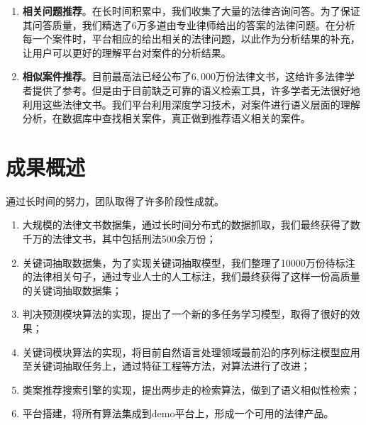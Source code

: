 \begin{enumerate}[1)]
	\item \textbf{相关问题推荐}。在长时间积累中，我们收集了大量的法律咨询问答。为了保证其问答质量，我们精选了$6$万多道由专业律师给出的答案的法律问题。在分析每一个案件时，平台相应的给出相关的法律问题，以此作为分析结果的补充，让用户可以更好的理解平台对案件的分析结果。
	\item \textbf{相似案件推荐}。目前最高法已经公布了$6,000$万份法律文书，这给许多法律学者提供了参考。但是由于目前缺乏可靠的语义检索工具，许多学者无法很好地利用这些法律文书。我们平台利用深度学习技术，对案件进行语义层面的理解分析，在数据库中查找相关案件，真正做到推荐语义相关的案件。
	\end{enumerate}


\section{成果概述}

通过长时间的努力，团队取得了许多阶段性成就。

\begin{enumerate}[1)]
	\item 大规模的法律文书数据集，通过长时间分布式的数据抓取，我们最终获得了数千万的法律文书，其中包括刑法500余万份；

	\item 关键词抽取数据集，为了实现关键词抽取模型，我们整理了10000万份待标注的法律相关句子，通过专业人士的人工标注，我们最终获得了这样一份高质量的关键词抽取数据集；

	\item 判决预测模块算法的实现，提出了一个新的多任务学习模型，取得了很好的效果；

	\item 关键词模块算法的实现，将目前自然语言处理领域最前沿的序列标注模型应用至关键词抽取任务上，通过特征工程等方法，对算法进行了改进；

	\item 类案推荐搜索引擎的实现，提出两步走的检索算法，做到了语义相似性检索；

	\item 平台搭建，将所有算法集成到demo平台上，形成一个可用的法律产品。
\end{enumerate}

